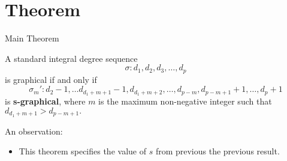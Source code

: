 \section{Theorem}

\begin{frame}{Main Theorem}
	\begin{theorem}
		A standard integral degree sequence 
		\begin{equation}
			\sigma: d_1,d_2,d_3,\ldots, d_p
		\end{equation}
		is graphical if and only if 
		\begin{equation*}
			\sigma_m':d_2-1,\ldots d_{d_1+m+1}-1,d_{d_1+m+2},\ldots, d_{p-m},d_{p-m+1}+1,\ldots,d_p+1
		\end{equation*}
		is \textbf{s-graphical}, where $m$ is the maximum non-negative integer such that $d_{d_1+m+1}>d_{p-m+1}.$
	\end{theorem}
		An observation:
	\begin{itemize}
		\item This theorem specifies the value of $s$ from previous the previous result.
	\end{itemize}
\end{frame}
